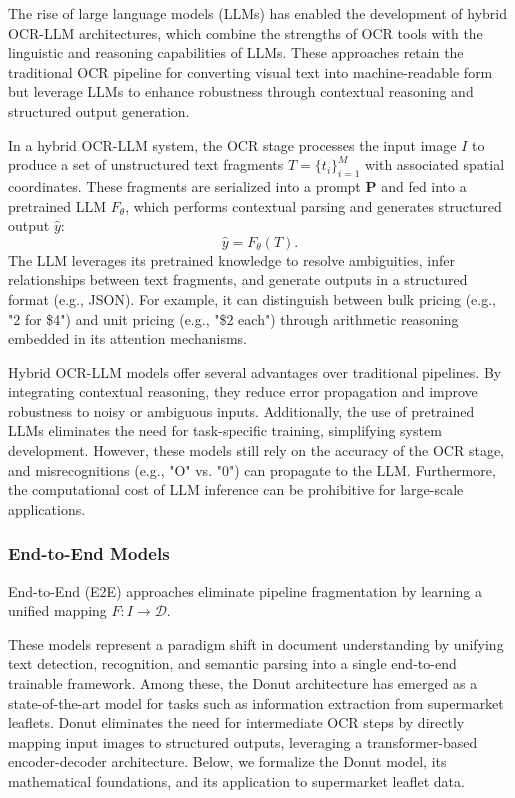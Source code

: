 \documentclass[11pt]{article}
\begin{document}
The rise of large language models (LLMs) has enabled the development of hybrid OCR-LLM architectures, which combine the strengths of OCR tools with the linguistic and reasoning capabilities of LLMs. These approaches retain the traditional OCR pipeline for converting visual text into machine-readable form but leverage LLMs to enhance robustness through contextual reasoning and structured output generation.

In a hybrid OCR-LLM system, the OCR stage processes the input image \( I \) to produce a set of unstructured text fragments \( T = \{t_i\}_{i=1}^{M} \) with associated spatial coordinates. These fragments are serialized into a prompt \( \mathbf{P} \) and fed into a pretrained LLM \( F_\theta \), which performs contextual parsing and generates structured output \( \hat{y} \):  
\[
\hat{y} = F_\theta (T).
\]  
The LLM leverages its pretrained knowledge to resolve ambiguities, infer relationships between text fragments, and generate outputs in a structured format (e.g., JSON). For example, it can distinguish between bulk pricing (e.g., "2 for \$4") and unit pricing (e.g., "\$2 each") through arithmetic reasoning embedded in its attention mechanisms.
 
Hybrid OCR-LLM models offer several advantages over traditional pipelines. By integrating contextual reasoning, they reduce error propagation and improve robustness to noisy or ambiguous inputs. Additionally, the use of pretrained LLMs eliminates the need for task-specific training, simplifying system development. However, these models still rely on the accuracy of the OCR stage, and misrecognitions (e.g., "O" vs. "0") can propagate to the LLM. Furthermore, the computational cost of LLM inference can be prohibitive for large-scale applications.

\subsubsection{End-to-End Models}
End-to-End (E2E) approaches eliminate pipeline fragmentation by learning a unified mapping $F: I \to \mathcal{D}$.

 These models represent a paradigm shift in document understanding by unifying text detection, recognition, and semantic parsing into a single end-to-end trainable framework. Among these, the Donut architecture \cite{kim2022donut} has emerged as a state-of-the-art model for tasks such as information extraction from supermarket leaflets. Donut eliminates the need for intermediate OCR steps by directly mapping input images to structured outputs, leveraging a transformer-based encoder-decoder architecture. Below, we formalize the Donut model, its mathematical foundations, and its application to supermarket leaflet data.
\end{document}
